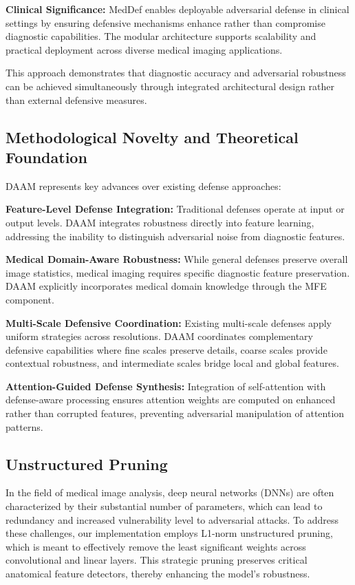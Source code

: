\documentclass[preprint,12pt]{elsarticle}
\begin{document}
\textbf{Clinical Significance:} MedDef enables deployable adversarial defense in clinical settings by ensuring defensive mechanisms enhance rather than compromise diagnostic capabilities. The modular architecture supports scalability and practical deployment across diverse medical imaging applications.

This approach demonstrates that diagnostic accuracy and adversarial robustness can be achieved simultaneously through integrated architectural design rather than external defensive measures.

\subsection{Methodological Novelty and Theoretical Foundation}
\label{sec:novelty}

DAAM represents key advances over existing defense approaches:

\textbf{Feature-Level Defense Integration:} Traditional defenses operate at input or output levels. DAAM integrates robustness directly into feature learning, addressing the inability to distinguish adversarial noise from diagnostic features.

\textbf{Medical Domain-Aware Robustness:} While general defenses preserve overall image statistics, medical imaging requires specific diagnostic feature preservation. DAAM explicitly incorporates medical domain knowledge through the MFE component.

\textbf{Multi-Scale Defensive Coordination:} Existing multi-scale defenses apply uniform strategies across resolutions. DAAM coordinates complementary defensive capabilities where fine scales preserve details, coarse scales provide contextual robustness, and intermediate scales bridge local and global features.

\textbf{Attention-Guided Defense Synthesis:} Integration of self-attention with defense-aware processing ensures attention weights are computed on enhanced rather than corrupted features, preventing adversarial manipulation of attention patterns.

\subsection{Unstructured Pruning}
In the field of medical image analysis, deep neural networks (DNNs) are often characterized by their substantial number of parameters, which can lead to redundancy and increased vulnerability level to adversarial attacks. To address these challenges, our implementation employs L1-norm unstructured pruning, which is meant to effectively remove the least significant weights across convolutional and linear layers. This strategic pruning preserves critical anatomical feature detectors, thereby enhancing the model's robustness.
\end{document}
